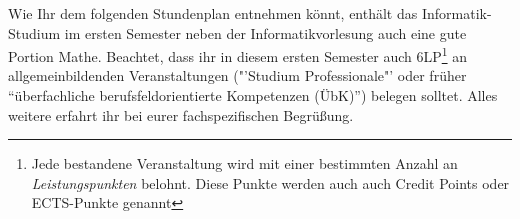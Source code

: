 Wie Ihr dem folgenden Stundenplan entnehmen könnt, enthält das Informatik-Studium im ersten
Semester neben der Informatikvorlesung auch eine gute Portion Mathe. Beachtet, dass ihr
in diesem ersten Semester auch 6LP\footnote{Jede bestandene Veranstaltung wird mit einer bestimmten Anzahl an \emph{Leistungspunkten} belohnt. Diese Punkte werden auch auch Credit Points oder ECTS-Punkte genannt} an allgemeinbildenden Veranstaltungen ("'Studium Professionale"' oder früher "`überfachliche berufsfeldorientierte Kompetenzen (ÜbK)"') belegen solltet.
Alles weitere erfahrt ihr bei eurer fachspezifischen Begrüßung.

\noindent{}

